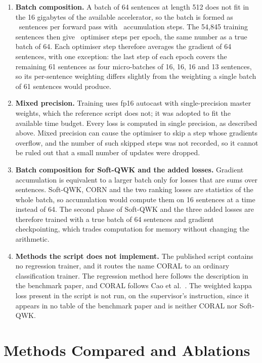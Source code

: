 \begin{enumerate}
\item \textbf{Batch composition.} A batch of 64 sentences at length 512 does not fit in the 16
gigabytes of the available accelerator, so the batch is formed as \microBatch\ sentences per
forward pass with \gradAccum\ accumulation steps. The 54{,}845 training sentences then give
\stepsPerEpoch\ optimiser steps per epoch, the same number as a true batch of 64. Each
optimiser step therefore averages the gradient of 64 sentences, with one exception: the last
step of each epoch covers the remaining 61 sentences as four micro-batches of 16, 16, 16 and
13 sentences, so its per-sentence weighting differs slightly from the weighting a single batch
of 61 sentences would produce.

\item \textbf{Mixed precision.} Training uses fp16 autocast with single-precision master
weights, which the reference script does not; it was adopted to fit the available time budget.
Every loss is computed in single precision, as described above. Mixed precision can cause the
optimiser to skip a step whose gradients overflow, and the number of such skipped steps was not
recorded, so it cannot be ruled out that a small number of updates were dropped.

\item \textbf{Batch composition for Soft-QWK and the added losses.} Gradient accumulation is
equivalent to a larger batch only for losses that are sums over sentences. Soft-QWK, CORN and the
two ranking losses are statistics of the whole batch, so accumulation would compute them on 16
sentences at a time instead of 64. The second phase of Soft-QWK and the three added losses are
therefore trained with a true batch of 64 sentences and gradient checkpointing, which trades
computation for memory without changing the arithmetic.

\item \textbf{Methods the script does not implement.} The published script contains no
regression trainer, and it routes the name CORAL to an ordinary classification trainer. The
regression method here follows the description in the benchmark paper, and CORAL follows Cao et
al.\ \cite{cao2020coral}. The weighted kappa loss present in the script is not run, on the
supervisor's instruction, since it appears in no table of the benchmark paper and is neither
CORAL nor Soft-QWK.
\end{enumerate}

\section{Methods Compared and Ablations}
\label{sec:meth-methods}

